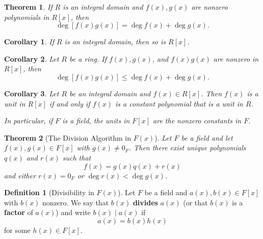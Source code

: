 \documentclass{article}
\newtheorem{theorem}{Theorem}[section]
\newtheorem{corollary}{Corollary}[section]
\theoremstyle{definition}
\newtheorem{definition}{Definition}[section]
\theoremstyle{remark}
\begin{document}
\begin{theorem} \label{thm:degree of product}
If $R$ is an integral domain and $f(x), g(x)$ are nonzero polynomials in $R[x]$, then
\[
\deg[f(x)g(x)] = \deg f(x) + \deg g(x).
\]
\end{theorem}


\begin{corollary} \label{cor:integral domain of polynomials}
If $R$ is an integral domain, then so is $R[x]$.
\end{corollary}



\begin{corollary} \label{cor:degree inequality}
Let $R$ be a ring. If $f(x), g(x)$, and $f(x)g(x)$ are nonzero in $R[x]$, then
\[
\deg [f(x)g(x)] \leq \deg f(x) + \deg g(x).
\]
\end{corollary}



\begin{corollary} \label{cor:units in polynomial ring}
Let $R$ be an integral domain and $f(x) \in R[x]$. Then $f(x)$ is a unit in $R[x]$ if and only if $f(x)$ is a constant polynomial that is a unit in $R$. 

In particular, if $F$ is a field, the units in $F[x]$ are the nonzero constants in $F$.
\end{corollary}




\begin{theorem}[The Division Algorithm in $F(x)$] \label{thm:division algorithm for polynomial}
Let $F$ be a field and let $f(x), g(x) \in F[x]$ with $g(x) \neq 0_F$. Then there exist unique polynomials $q(x)$ and $r(x)$ such that
\[
f(x) = g(x)q(x) + r(x)
\]
and either $r(x) = 0_F$ or $\deg r(x) < \deg g(x)$.
\end{theorem}


\begin{definition}[Divisibility in $F(x)$]
Let $F$ be a field and $a(x), b(x) \in F[x]$ with $b(x)$ nonzero. We say that $b(x)$ \textbf{divides} $a(x)$ (or that $b(x)$ is a \textbf{factor} of $a(x)$) and write $b(x) \mid a(x)$ if
\[
a(x) = b(x) h(x)
\]
for some $h(x) \in F[x]$.
\end{definition}
\end{document}
